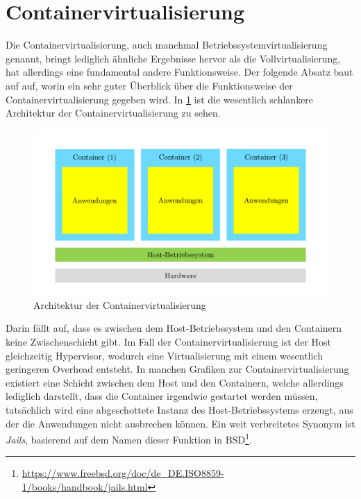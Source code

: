 \section{Containervirtualisierung}
\label{sec:containervirtualisierung}
Die Containervirtualisierung, auch manchmal Betriebssystemvirtualisierung genannt, bringt lediglich ähnliche Ergebnisse hervor als die Vollvirtualisierung, hat allerdings eine fundamental andere Funktionsweise.
Der folgende Absatz baut auf \autocite{EntwicklerDE2015} auf, worin ein sehr guter Überblick über die Funktionsweise der Containervirtualisierung gegeben wird.
In \cref{fig:architektur-containervirtualisierung} ist die wesentlich schlankere Architektur der Containervirtualisierung zu sehen.
\begin{figure}[htbp]
    \centering
    \includegraphics[width=0.9\linewidth,clip]{images/containervirtualisierung}
    \caption{Architektur der Containervirtualisierung}
    \label{fig:architektur-containervirtualisierung}
\end{figure}
Darin fällt auf, dass es zwischen dem Host-Betriebssystem und den Containern keine Zwischenschicht gibt.
Im Fall der Containervirtualisierung ist der Host gleichzeitig Hypervisor, wodurch eine Virtualisierung mit einem wesentlich geringeren Overhead entsteht.
In manchen Grafiken zur Containervirtualisierung existiert eine Schicht zwischen dem Host und den Containern, welche allerdings lediglich darstellt, dass die Container irgendwie gestartet werden müssen, tatsächlich wird eine abgeschottete Instanz des Host-Betriebssystems erzeugt, aus der die Anwendungen nicht ausbrechen können.
Ein weit verbreitetes Synonym ist \emph{Jails}, basierend auf dem Namen dieser Funktion in BSD\footnote{\url{https://www.freebsd.org/doc/de_DE.ISO8859-1/books/handbook/jails.html}}.

